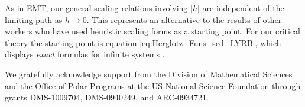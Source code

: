 \documentclass[english,12pt,jmp,graphicx]{revtex4-1}
\begin{document}
As in EMT, our general scaling relations involving $|h|$ are
independent of the limiting path as $h\to0$. This represents an
alternative to the results of other workers
\cite{Efros:PSSB-303,Clerc:AP-191,Bergman:SSP-147} who have used
heuristic scaling forms as a starting point. For our critical theory
the starting point is equation \eqref{eq:Herglotz_Funs_sed_LYRB},
which displays \emph{exact} formulas for infinite systems
\cite{Golden:PRL-3935}. 



%
%

%

\begin{acknowledgments}
We gratefully acknowledge support from the Division of Mathematical
Sciences and the Office of Polar Programs at the US National Science
Foundation through grants DMS-1009704, DMS-0940249, and ARC-0934721.
\end{acknowledgments}



\end{document}
